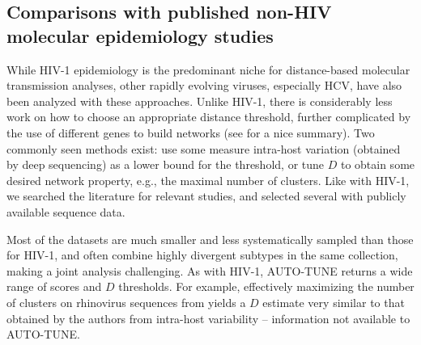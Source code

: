 \documentclass[utf8]{FrontiersinHarvard} %
\begin{document}
\subsection{Comparisons with published non-HIV molecular epidemiology studies}

While HIV-1 epidemiology is the predominant niche for distance-based molecular
transmission analyses, other rapidly evolving viruses, especially HCV, have also
been analyzed with these approaches. Unlike HIV-1, there is considerably less
work on how to choose an appropriate distance threshold, further complicated by
the use of different genes to build networks (see \citet{Chan:2020aa} for a nice
summary). Two commonly seen methods exist: use some measure intra-host variation
(obtained by deep sequencing) as a lower bound for the threshold, or tune $D$ to
obtain some desired network property, e.g., the maximal number of clusters. Like
with HIV-1, we searched the literature for relevant studies, and selected
several with publicly available sequence data.  

Most of the datasets are much smaller and less systematically sampled than those
for HIV-1, and often combine highly divergent subtypes in the same collection,
making a joint analysis challenging. As with HIV-1, AUTO-TUNE returns a wide
range of scores and $D$ thresholds. For example, effectively maximizing the
number of clusters on rhinovirus sequences from \citet{Ng:2022aa} yields a $D$
estimate very similar to that obtained by the authors from intra-host
variability -- information not available to AUTO-TUNE.
\end{document}

